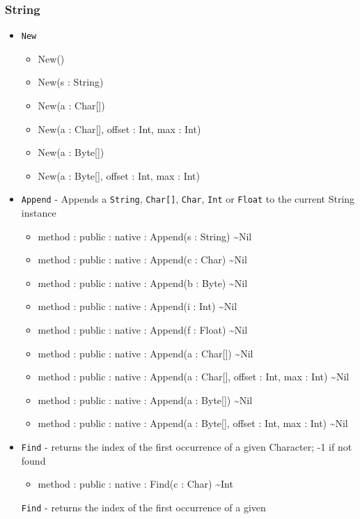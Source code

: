 \documentclass[11pt]{article}
\begin{document}
\subsubsection{String}
\begin{itemize}
\item \texttt{New}
  \begin{itemize}
  \item New()
  \item New(s : String)
  \item New(a : Char[])
  \item New(a : Char[], offset : Int, max : Int)   
  \item New(a : Byte[])
  \item New(a : Byte[], offset : Int, max : Int) 
  \end{itemize}
\item \texttt{Append} - Appends a \texttt{String}, \texttt{Char[]},
  \texttt{Char}, \texttt{Int} or \texttt{Float} to the current String
  instance
  \begin{itemize}
  \item method : public : native : Append(s : String) \textasciitilde Nil
  \item method : public : native : Append(c : Char) \textasciitilde Nil
  \item method : public : native : Append(b : Byte) \textasciitilde Nil
  \item method : public : native : Append(i : Int) \textasciitilde Nil
  \item method : public : native : Append(f : Float) \textasciitilde Nil
  \item method : public : native : Append(a : Char[]) \textasciitilde Nil
  \item method : public : native : Append(a : Char[], offset : Int, max : Int) \textasciitilde Nil
  \item method : public : native : Append(a : Byte[]) \textasciitilde Nil
  \item method : public : native : Append(a : Byte[], offset : Int, max : Int) \textasciitilde Nil
  \end{itemize}
\item \texttt{Find} - returns the index of the first occurrence of a
  given Character; -1 if not found
  \begin{itemize}
  \item method : public : native : Find(c : Char) \textasciitilde Int
  \end{itemize}
  \texttt{Find} - returns the index of the first occurrence of a given

\end{itemize}
\end{document}
